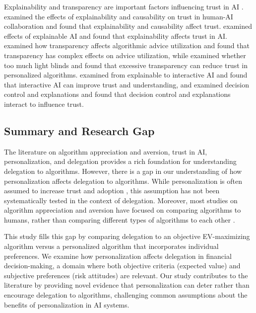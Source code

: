 Explainability and transparency are important factors influencing trust in AI \citep{shin2021, leightmann2023}. \citet{shin2021} examined the effects of explainability and causability on trust in human-AI collaboration and found that explainability and causability affect trust. \citet{leightmann2023} examined effects of explainable AI and found that explainability affects trust in AI. \citet{ning2024} examined how transparency affects algorithmic advice utilization and found that transparency has complex effects on advice utilization, while \citet{hu2024} examined whether too much light blinds and found that excessive transparency can reduce trust in personalized algorithms. \citet{raes2024} examined from explainable to interactive AI and found that interactive AI can improve trust and understanding, and \citet{westphal2023} examined decision control and explanations and found that decision control and explanations interact to influence trust.

\subsection{Summary and Research Gap}

The literature on algorithm appreciation and aversion, trust in AI, personalization, and delegation provides a rich foundation for understanding delegation to algorithms. However, there is a gap in our understanding of how personalization affects delegation to algorithms. While personalization is often assumed to increase trust and adoption \citep{longoni2019, jussupow2020}, this assumption has not been systematically tested in the context of delegation. Moreover, most studies on algorithm appreciation and aversion have focused on comparing algorithms to humans, rather than comparing different types of algorithms to each other \citep{dietvorst2015, logg2019}.

This study fills this gap by comparing delegation to an objective EV-maximizing algorithm versus a personalized algorithm that incorporates individual preferences. We examine how personalization affects delegation in financial decision-making, a domain where both objective criteria (expected value) and subjective preferences (risk attitudes) are relevant. Our study contributes to the literature by providing novel evidence that personalization can deter rather than encourage delegation to algorithms, challenging common assumptions about the benefits of personalization in AI systems.